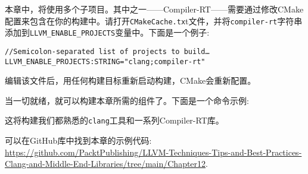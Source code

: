 本章中，将使用多个子项目。其中之一——Compiler-RT——需要通过修改CMake配置来包含在你的构建中。请打开\texttt{CMakeCache.tx}t文件，并将\texttt{compiler-rt}字符串添加到\texttt{LLVM\_ENABLE\_PROJECTS}变量中。下面是一个例子:

\begin{lstlisting}[style=styleCMake]
//Semicolon-separated list of projects to build…
LLVM_ENABLE_PROJECTS:STRING="clang;compiler-rt"
\end{lstlisting}

编辑该文件后，用任何构建目标重新启动构建，CMake会重新配置。

当一切就绪，就可以构建本章所需的组件了。下面是一个命令示例:


这将构建我们都熟悉的\texttt{clang}工具和一系列Compiler-RT库。

可以在GitHub库中找到本章的示例代码: \url{https://github.com/PacktPublishing/LLVM-Techniques-Tips-and-Best-Practices-Clang-and-Middle-End-Libraries/tree/main/Chapter12}.





















